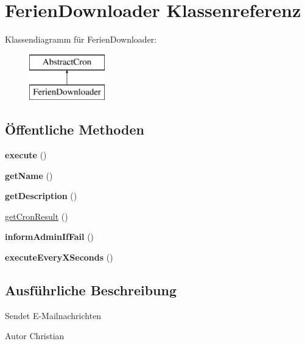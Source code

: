 \hypertarget{class_ferien_downloader}{}\section{Ferien\+Downloader Klassenreferenz}
\label{class_ferien_downloader}
Klassendiagramm für Ferien\+Downloader\+:\begin{figure}[H]
\begin{center}
\leavevmode
\includegraphics[height=2.000000cm]{class_ferien_downloader}
\end{center}
\end{figure}
\subsection*{Öffentliche Methoden}
\begin{DoxyCompactItemize}
\item 
\mbox{\label{class_ferien_downloader_a40029e6c26b402a0a6af00beca22fb88}} 
{\bfseries execute} ()
\item 
\mbox{\label{class_ferien_downloader_a44f89b1c7137bdf3faff53d8f12a4330}} 
{\bfseries get\+Name} ()
\item 
\mbox{\label{class_ferien_downloader_a4c6756675ec26ca150e6c913a0a4f53b}} 
{\bfseries get\+Description} ()
\item 
\mbox{\hyperlink{class_ferien_downloader_a9ca46e8feeebeb1ad9b0a77da03ca0a1}{get\+Cron\+Result}} ()
\item 
\mbox{\label{class_ferien_downloader_a649197c8da3b6e4a54fb3e737652dada}} 
{\bfseries inform\+Admin\+If\+Fail} ()
\item 
\mbox{\label{class_ferien_downloader_ab66b94a4a7376ef88242a712cd2e33d2}} 
{\bfseries execute\+Every\+X\+Seconds} ()
\end{DoxyCompactItemize}


\subsection{Ausführliche Beschreibung}
Sendet E-\/\+Mailnachrichten \begin{DoxyAuthor}{Autor}
Christian 
\end{DoxyAuthor}


